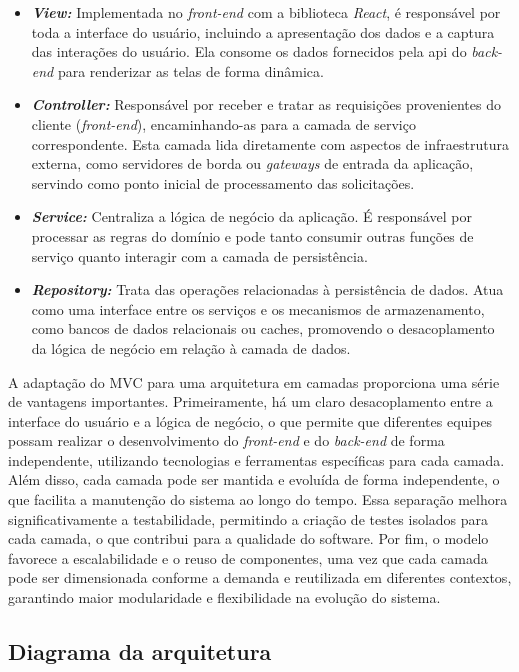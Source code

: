 \begin{itemize}
  \item \textbf{\emph{View:}} Implementada no \emph{front-end} com a biblioteca \emph{React}, é responsável por toda a interface do usuário, incluindo a apresentação dos dados e a captura das interações do usuário. Ela consome os dados fornecidos pela \gls{api} do \emph{back-end} para renderizar as telas de forma dinâmica.
  \item \textbf{\emph{Controller:}} Responsável por receber e tratar as requisições provenientes do cliente (\emph{front-end}), encaminhando-as para a camada de serviço correspondente. Esta camada lida diretamente com aspectos de infraestrutura externa,  como servidores de borda ou \emph{gateways} de entrada da aplicação, servindo como ponto inicial de processamento das solicitações.
  \item \textbf{\emph{Service:}} Centraliza a lógica de negócio da aplicação. É responsável por processar as regras do domínio e pode tanto consumir outras funções de serviço quanto interagir com a camada de persistência.
  \item \textbf{\emph{Repository:}} Trata das operações relacionadas à persistência de dados. Atua como uma interface entre os serviços e os mecanismos de armazenamento, como bancos de dados relacionais ou caches, promovendo o desacoplamento da lógica de negócio em relação à camada de dados.
\end{itemize}

A adaptação do MVC para uma arquitetura em camadas proporciona uma série de vantagens importantes. Primeiramente, há um claro desacoplamento entre a interface do usuário e a lógica de negócio, o que permite que diferentes equipes possam realizar o desenvolvimento do \emph{front-end} e do \emph{back-end} de forma independente, utilizando tecnologias e ferramentas específicas para cada camada. Além disso, cada camada pode ser mantida e evoluída de forma independente, o que facilita a manutenção do sistema ao longo do tempo. Essa separação melhora significativamente a testabilidade, permitindo a criação de testes isolados para cada camada, o que contribui para a qualidade do software. Por fim, o modelo favorece a escalabilidade e o reuso de componentes, uma vez que cada camada pode ser dimensionada conforme a demanda e reutilizada em diferentes contextos, garantindo maior modularidade e flexibilidade na evolução do sistema.

\subsection{Diagrama da arquitetura}

